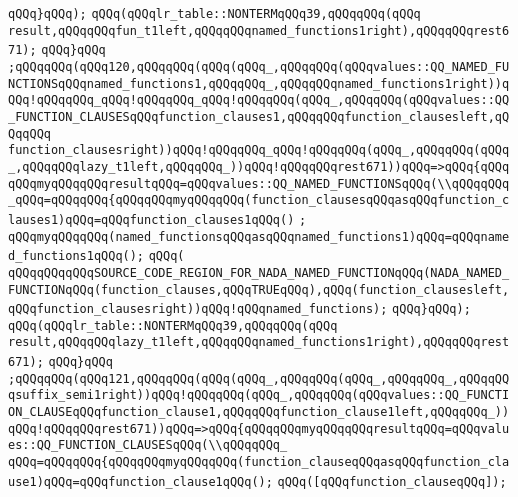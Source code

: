 \verb|qQQq}qQQq);|\newline
\verb|qQQq(qQQqlr_table::NONTERMqQQq39,qQQqqQQq(qQQq|\newline
\verb|result,qQQqqQQqfun_t1left,qQQqqQQqnamed_functions1right),qQQqqQQqrest671);|\newline
\verb|qQQq}qQQq|\newline
\verb|;qQQqqQQq(qQQq120,qQQqqQQq(qQQq(qQQq_,qQQqqQQq(qQQqvalues::QQ_NAMED_FUNCTIONSqQQqnamed_functions1,qQQqqQQq_,qQQqqQQqnamed_functions1right))qQQq!qQQqqQQq_qQQq!qQQqqQQq_qQQq!qQQqqQQq(qQQq_,qQQqqQQq(qQQqvalues::QQ_FUNCTION_CLAUSESqQQqfunction_clauses1,qQQqqQQqfunction_clausesleft,qQQqqQQq|\newline
\verb|function_clausesright))qQQq!qQQqqQQq_qQQq!qQQqqQQq(qQQq_,qQQqqQQq(qQQq_,qQQqqQQqlazy_t1left,qQQqqQQq_))qQQq!qQQqqQQqrest671))qQQq=>qQQq{qQQqqQQqmyqQQqqQQqresultqQQq=qQQqvalues::QQ_NAMED_FUNCTIONSqQQq(\\qQQqqQQq_qQQq=qQQqqQQq{qQQqqQQqmyqQQqqQQq(function_clausesqQQqasqQQqfunction_clauses1)qQQq=qQQqfunction_clauses1qQQq()|\newline
\verb|;|\newline
\verb|qQQqmyqQQqqQQq(named_functionsqQQqasqQQqnamed_functions1)qQQq=qQQqnamed_functions1qQQq();|\newline
\verb|qQQq(|\newline
\verb|qQQqqQQqqQQqSOURCE_CODE_REGION_FOR_NADA_NAMED_FUNCTIONqQQq(NADA_NAMED_FUNCTIONqQQq(function_clauses,qQQqTRUEqQQq),qQQq(function_clausesleft,qQQqfunction_clausesright))qQQq!qQQqnamed_functions);|\newline
\verb|qQQq}qQQq);|\newline
\verb|qQQq(qQQqlr_table::NONTERMqQQq39,qQQqqQQq(qQQq|\newline
\verb|result,qQQqqQQqlazy_t1left,qQQqqQQqnamed_functions1right),qQQqqQQqrest671);|\newline
\verb|qQQq}qQQq|\newline
\verb|;qQQqqQQq(qQQq121,qQQqqQQq(qQQq(qQQq_,qQQqqQQq(qQQq_,qQQqqQQq_,qQQqqQQqsuffix_semi1right))qQQq!qQQqqQQq(qQQq_,qQQqqQQq(qQQqvalues::QQ_FUNCTION_CLAUSEqQQqfunction_clause1,qQQqqQQqfunction_clause1left,qQQqqQQq_))qQQq!qQQqqQQqrest671))qQQq=>qQQq{qQQqqQQqmyqQQqqQQqresultqQQq=qQQqvalues::QQ_FUNCTION_CLAUSESqQQq(\\qQQqqQQq_|\newline
\verb|qQQq=qQQqqQQq{qQQqqQQqmyqQQqqQQq(function_clauseqQQqasqQQqfunction_clause1)qQQq=qQQqfunction_clause1qQQq();|\newline
\verb|qQQq([qQQqfunction_clauseqQQq]);|\newline
